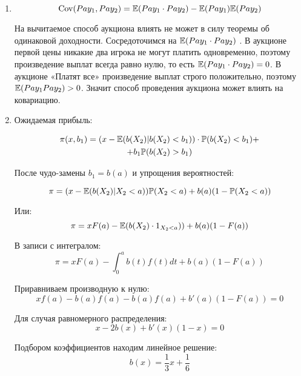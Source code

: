 

\begin{enumerate}
\item

\begin{equation}
\operatorname{Cov}(Pay_{1}, Pay_{2})=\mathbb{E}(Pay_{1}\cdot Pay_{2})-\mathbb{E}(Pay_{1})\mathbb{E}(Pay_{2})
\end{equation}

На вычитаемое способ аукциона влиять не может в силу теоремы об одинаковой доходности. Сосредоточимся на $\mathbb{E}(Pay_{1}\cdot Pay_{2})$ . В аукционе первой цены никакие два игрока не могут платить одновременно, поэтому произведение выплат всегда равно нулю, то есть $ \mathbb{E}(Pay_{1}\cdot Pay_{2})=0 $. В аукционе «Платят все» произведение выплат строго положительно, поэтому $ \mathbb{E}(Pay_{1}Pay_{2})>0 $. Значит способ проведения аукциона может влиять на ковариацию.



\item  Ожидаемая прибыль:

\begin{multline}
\pi(x,b_{1})=(x-\mathbb{E}(b(X_{2})|b(X_{2})<b_{1}))\cdot \mathbb{P}(b(X_{2})<b_{1})+\\
+b_{1}\mathbb{P}(b(X_{2})>b_{1})
\end{multline}

После чудо-замены $ b_{1}=b(a) $ и упрощения вероятностей:

\begin{equation}
\pi=(x-\mathbb{E}(b(X_{2})|X_{2}<a))\mathbb{P}(X_{2}<a)+b(a)(1-\mathbb{P}(X_{2}<a))
\end{equation}

Или:
\begin{equation}
\pi=xF(a)-\mathbb{E}(b(X_{2})\cdot 1_{X_{2}<a}))+b(a)(1-F(a))
\end{equation}

В записи с интегралом:
\begin{equation}
\pi=xF(a)-\int_{0}^{a}b(t)f(t)dt+b(a)(1-F(a))
\end{equation}

Приравниваем производную к нулю:
\begin{equation}
xf(a)-b(a)f(a)-b(a)f(a)+b'(a)(1-F(a))=0
\end{equation}

Для случая равномерного распределения:
\begin{equation}
x-2b(x)+b'(x)(1-x)=0
\end{equation}

Подбором коэффициентов находим линейное решение:
\begin{equation}
b(x)=\frac{1}{3}x+\frac{1}{6}
\end{equation}



\end{enumerate}
